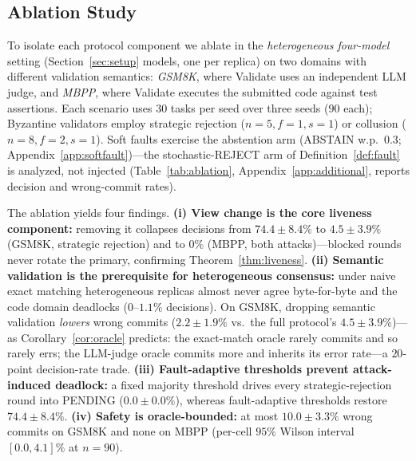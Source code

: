 \documentclass{article}
\begin{document}
\subsection{Ablation Study}

To isolate each protocol component we ablate in the \emph{heterogeneous four-model} setting (Section~\ref{sec:setup} models, one per replica) on two domains with different validation semantics: \emph{GSM8K}, where Validate uses an independent LLM judge, and \emph{MBPP}, where Validate executes the submitted code against test assertions. Each scenario uses 30 tasks per seed over three seeds ($90$ each); Byzantine validators employ strategic rejection ($n{=}5, f{=}1, s{=}1$) or collusion ($n{=}8, f{=}2, s{=}1$). Soft faults exercise the abstention arm (ABSTAIN w.p.\ $0.3$; Appendix~\ref{app:softfault})---the stochastic-REJECT arm of Definition~\ref{def:fault} is analyzed, not injected (Table~\ref{tab:ablation}, Appendix~\ref{app:additional}, reports decision and wrong-commit rates).


The ablation yields four findings. \textbf{(i) View change is the core liveness component:} removing it collapses decisions from $74.4 \pm 8.4\%$ to $4.5 \pm 3.9\%$ (GSM8K, strategic rejection) and to $0\%$ (MBPP, both attacks)---blocked rounds never rotate the primary, confirming Theorem~\ref{thm:liveness}. \textbf{(ii) Semantic validation is the prerequisite for heterogeneous consensus:} under naive exact matching heterogeneous replicas almost never agree byte-for-byte and the code domain deadlocks ($0$--$1.1\%$ decisions). On GSM8K, dropping semantic validation \emph{lowers} wrong commits ($2.2 \pm 1.9\%$ vs.\ the full protocol's $4.5 \pm 3.9\%$)---as Corollary~\ref{cor:oracle} predicts: the exact-match oracle rarely commits and so rarely errs; the LLM-judge oracle commits more and inherits its error rate---a $20$-point decision-rate trade. \textbf{(iii) Fault-adaptive thresholds prevent attack-induced deadlock:} a fixed majority threshold drives every strategic-rejection round into PENDING ($0.0 \pm 0.0\%$), whereas fault-adaptive thresholds restore $74.4 \pm 8.4\%$. \textbf{(iv) Safety is oracle-bounded:} at most $10.0 \pm 3.3\%$ wrong commits on GSM8K and none on MBPP (per-cell $95\%$ Wilson interval $[0.0, 4.1]\%$ at $n{=}90$).
\end{document}
